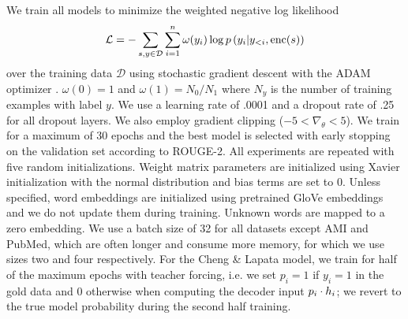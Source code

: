 


We train all models to minimize the weighted negative log likelihood
\[\mathcal{L} = -\sum_{s,y\in \mathcal{D}} \sum_{i=1}^\docSize \omega(y_i) \log p\left(y_i|y_{<i},
\operatorname{enc}(\sent)\right)\]
over the training data $\mathcal{D}$
using stochastic gradient descent with the ADAM optimizer
\cite{kingma2014adam}.
$\omega(0)=1$ and $\omega(1) = N_0/N_1$ where $N_y$ is the number of 
training examples with label $y$.
    We use a learning rate of .0001 and a dropout rate of .25 for all dropout
    layers. We also employ gradient clipping ($-5 < \nabla_\theta < 5$).
    We train for a maximum of 30 epochs and the best
    model is selected with early stopping on the validation set according
    to ROUGE-2. All experiments are repeated with five random
    initializations. Weight matrix parameters are initialized using 
    Xavier initialization with the normal distribution 
    \cite{glorot2010understanding} and bias terms are set to 0.
    Unless specified, word embeddings are initialized 
    using pretrained GloVe embeddings \cite{pennington2014glove} and we do 
    not update them during training. Unknown words are mapped to a zero 
    embedding.
    We use a batch size of 32 for all datasets except AMI and PubMed, which
    are often longer and consume more memory, for
    which we use sizes two and four respectively.
    For the Cheng \& Lapata model, we train for half of the maximum epochs 
    with teacher forcing, i.e. we set $p_i = 1$
    if $y_i = 1$ in the gold data and 0 otherwise 
    when computing the decoder input 
    $p_i \cdot \sentEmb[i]$; we revert to the true model probability 
    during the second half training.


